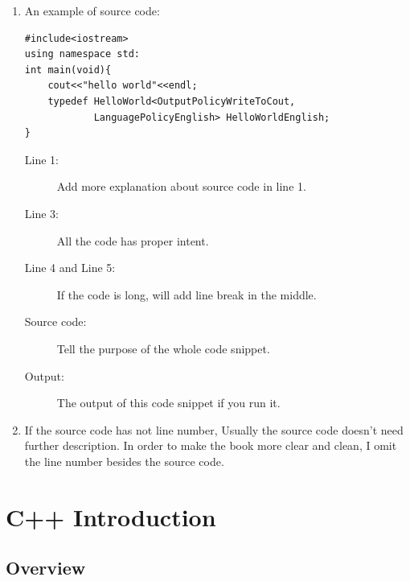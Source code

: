 \documentclass[a4paper,11pt,twoside]{book}
\begin{document}
\begin{itemize}
\begin{enumerate}
		\item An example of source code:
\begin{lstlisting}
#include<iostream>
using namespace std:
int main(void){
	cout<<"hello world"<<endl;
	typedef HelloWorld<OutputPolicyWriteToCout, 
			LanguagePolicyEnglish> HelloWorldEnglish;
}
\end{lstlisting}
\begin{description}
	\item[Line 1:] Add more explanation about source code in line 1.
	\item[Line 3:] All the code has proper intent.
	\item[Line 4 and Line 5:] If the code is long, will add line break in the middle. 
	\item[Source code:] Tell the purpose of the whole code snippet.
	\item[Output:] The output of this code snippet if you run it.
\end{description}

		\item If the source code has not line number, Usually the source code doesn't need further description. In order to make the book more clear and clean, I omit the line number besides the source code.


	\end{enumerate}



\end{itemize}

\chapter{C++ Introduction}
\section{Overview}
\end{document}
